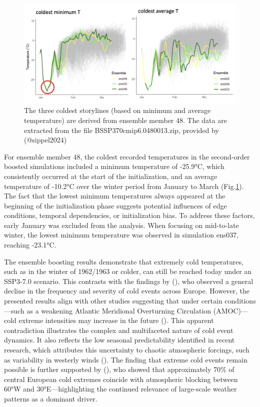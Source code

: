 \documentclass[
]{krantz}
\begin{document}
\begin{figure}

{\centering \includegraphics[width=0.9\linewidth]{work/03-coldex/figures/boosting_results48} 

}

\caption{The three coldest storylines (based on minimum and average temperature) are derived from ensemble member 48. The data are extracted from the file BSSP370cmip6.0480013.zip, provided by (@sippel2024)}\label{fig:boosting-result48}
\end{figure}

For ensemble member 48, the coldest recorded temperatures in the second-order boosted simulations included a minimum temperature of -25.9°C, which consistently occurred at the start of the initialization, and an average temperature of -10.2°C over the winter period from January to March (Fig.\ref{fig:boosting-result48}). The fact that the lowest minimum temperatures always appeared at the beginning of the initialization phase suggests potential influences of edge conditions, temporal dependencies, or initialization bias. To address these factors, early January was excluded from the analysis. When focusing on mid-to-late winter, the lowest minimum temperature was observed in simulation ens037, reaching -23.1°C.

The ensemble boosting results demonstrate that extremely cold temperatures, such as in the winter of 1962/1963 or colder, can still be reached today under an SSP3-7.0 scenario. This contrasts with the findings by (\citet{quesada2023}), who observed a general decline in the frequency and severity of cold events across Europe. However, the presented results align with other studies suggesting that under certain conditions---such as a weakening Atlantic Meridional Overturning Circulation (AMOC)---cold extreme intensities may increase in the future (\citet{meccia2023}). This apparent contradiction illustrates the complex and multifaceted nature of cold event dynamics. It also reflects the low seasonal predictability identified in recent research, which attributes this uncertainty to chaotic atmospheric forcings, such as variability in westerly winds (\citet{kautz2021}). The finding that extreme cold events remain possible is further supported by (\citet{brunner2018}), who showed that approximately 70\% of central European cold extremes coincide with atmospheric blocking between 60°W and 30°E---highlighting the continued relevance of large-scale weather patterns as a dominant driver.
\end{document}

